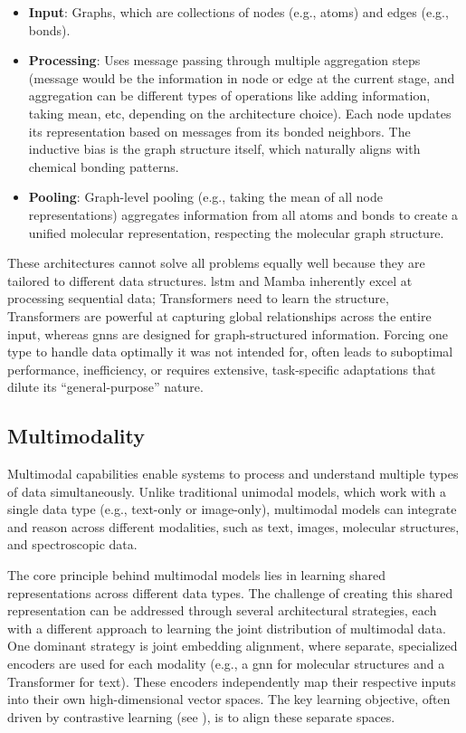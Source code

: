 \begin{itemize}
    \item \textbf{Input}: Graphs, which are collections of nodes (e.g., atoms) and edges (e.g., bonds).
    \item \textbf{Processing}: Uses message passing through multiple aggregation steps (message would be the information in node or edge at the current stage, and aggregation can be different types of operations like adding information, taking mean, etc, depending on the architecture choice). Each node updates its representation based on messages from its bonded neighbors. The inductive bias is the graph structure itself, which naturally aligns with chemical bonding patterns.
    \item \textbf{Pooling}: Graph-level pooling (e.g., taking the mean of all node representations) aggregates information from all atoms and bonds to create a unified molecular representation, respecting the molecular graph structure.
\end{itemize}

\noindent These architectures cannot solve all problems equally well because they are tailored to different data structures. 
\gls{lstm} and Mamba inherently excel at processing sequential data; Transformers need to learn the structure, Transformers are powerful at capturing global relationships across the entire input,
whereas \glspl{gnn} are designed for graph-structured information. 
Forcing one type to handle data optimally it was not intended for, often leads to suboptimal performance, inefficiency, or requires extensive, task-specific adaptations that dilute its \enquote{general-purpose} nature.\autocite{alampara2024mattext}


\subsection{Multimodality}

Multimodal capabilities enable systems to process and understand multiple types of data simultaneously. 
Unlike traditional unimodal models, which work with a single data type (e.g., text-only or image-only), multimodal models can integrate and reason across different modalities, such as text, images, molecular structures, and spectroscopic data.

The core principle behind multimodal models lies in learning shared representations across different data types.  The challenge of creating this shared representation can be addressed through several architectural strategies, each with a different approach to learning the joint distribution of multimodal data. One dominant strategy is joint embedding alignment, where separate, specialized encoders are used for each modality (e.g., a \gls{gnn} for molecular structures and a Transformer for text). These encoders independently map their respective inputs into their own high-dimensional vector spaces. The key learning objective, often driven by contrastive learning (see ), is to align these separate spaces. 


